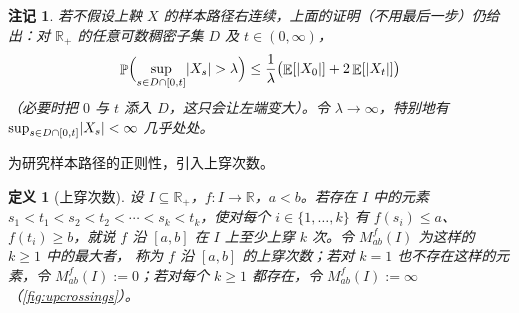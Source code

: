 \documentclass[UTF8,11pt,a4paper,oneside,fontset=fandol]{ctexrep}
\numberwithin{equation}{section}
\theoremstyle{zhthm}
\newtheorem{definition}[theorem]{定义}
\newtheorem{remark}[theorem]{注记}
\newcommand{\R}{\mathbb{R}}
\DeclareMathOperator{\Prob}{\mathbb{P}}
\DeclareMathOperator{\E}{\mathbb{E}}
\DeclarePairedDelimiter{\abs}{\lvert}{\rvert}
\begin{document}
\begin{remark}
\label{rem:maximal-inequality-without-regularity}
若不假设上鞅 $X$ 的样本路径右连续，上面的证明（不用最后一步）仍给出：对 $\R_+$ 的任意可数稠密子集 $D$ 及 $t\in(0,\infty)$，
\[
  \Prob\Bigl(\sup_{s\in D\cap[0,t]}\abs{X_s}>\lambda\Bigr)\le\frac1\lambda\bigl(\E[\abs{X_0}]+2\E[\abs{X_t}]\bigr)
\]
（必要时把 $0$ 与 $t$ 添入 $D$，这只会让左端变大）。令 $\lambda\to\infty$，特别地有 $\sup_{s\in D\cap[0,t]}\abs{X_s}<\infty$ 几乎处处。
\end{remark}

为研究样本路径的正则性，引入上穿次数。

\begin{definition}[上穿次数]
\label{def:upcrossing-number}
设 $I\subseteq\R_+$，$f:I\to\R$，$a<b$。若存在 $I$ 中的元素 $s_1<t_1<s_2<t_2<\cdots<s_k<t_k$，使对每个 $i\in\{1,\ldots,k\}$ 有
$f(s_i)\le a$、$f(t_i)\ge b$，就说 $f$ 沿 $[a,b]$ 在 $I$ 上至少上穿 $k$ 次。令 $M^f_{ab}(I)$ 为这样的 $k\ge1$ 中的最大者，
称为 $f$ 沿 $[a,b]$ 的上穿次数；若对 $k=1$ 也不存在这样的元素，令 $M^f_{ab}(I):=0$；若对每个 $k\ge1$ 都存在，令 $M^f_{ab}(I):=\infty$（\cref{fig:upcrossings}）。
\end{definition}
\end{document}
